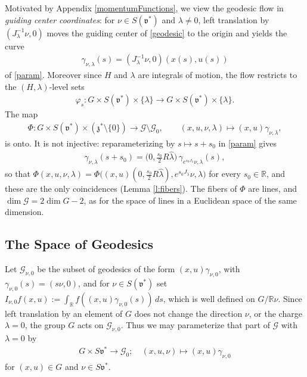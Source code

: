 \documentclass[11pt]{amsart}
\theoremstyle{plain}
\theoremstyle{definition}
\theoremstyle{remark}
\numberwithin{equation}{section}
\def\fz{\mathfrak{z}}
\def\fv{\mathfrak{v}}
\def\cG{\mathcal{G}}
\def\mz{\setminus\{0\}}
\def\R{{\mathbb R}}%
\numberwithin{equation}{section}
\begin{document}
Motivated by Appendix \ref{momentumFunctions}, we view the geodesic flow in \textit{guiding center coordinates}: for $\nu\in S(\fv^*)$ and $\lambda\neq0$, left translation by $(J_\lambda^{-1}\nu, 0)$ moves the guiding center of \eqref{geodesic} to the origin and yields the curve
\begin{align*}
	\gamma_{\nu, \lambda}(s)=\left(J_\lambda^{-1}\nu, 0\right)(x(s), u(s))
\end{align*}
of \eqref{param}.
Moreover since $H$ and $\lambda$ are integrals of motion, the flow restricts to the $(H, \lambda)$-level sets
\begin{align*}
	\varphi_{s}: G\times S(\fv^*)\times\{\lambda\}\to G\times S(\fv^*)\times\{\lambda\}.
\end{align*}
The map
\begin{align*}
	\Phi: G\times S(\fv^*)\times(\fz^*\mz)\to\cG\setminus\cG_0, \qquad (x, u, \nu, \lambda)\longmapsto(x, u)\gamma_{\nu, \lambda},
\end{align*}
is onto. It is not injective: reparameterizing by $s\mapsto s+s_0$ in \eqref{param} gives
\begin{align}\label{e:reparam}
	\gamma_{\nu, \lambda}(s+s_0)=\big(0, \tfrac{s_0}{2}R\hat\lambda\big)\,\gamma_{e^{s_0J_\lambda}\nu, \lambda}(s),
\end{align}
so that $\Phi(x, u, \nu, \lambda)=\Phi\big((x, u)(0, \tfrac{s_0}{2}R\hat\lambda), e^{s_0J_\lambda}\nu, \lambda\big)$ for every $s_0\in \R$, and these are the only coincidences (Lemma \ref{l:fibers}). The fibers of $\Phi$ are lines, and $\dim\cG=2\dim G-2$, as for the space of lines in a Euclidean space of the same dimension.
\subsection{The Space of Geodesics}\label{spaceGeodesics}
Let $\cG_{\nu, 0}$ be the subset of geodesics of the form $(x, u)\gamma_{\nu, 0}$, with $\gamma_{\nu, 0}(s)=(s\nu, 0)$, and for $\nu\in S(\fv^*)$ set $I_{\nu, 0}f(x, u):=\int_\R f((x, u)\gamma_{\nu, 0}(s))\,ds$, which is well defined on $G/\R\nu$. Since left translation by an element of $G$ does not change the direction $\nu$, or the charge $\lambda=0$, the group $G$ acts on $\cG_{\nu, 0}$. Thus we may  parameterize that part of $\cG$ with $\lambda=0$ by 
\begin{align*}
	G\times S\fv^*\to \cG_{0}; \quad (x, u, \nu)\mapsto (x, u)\gamma_{\nu, 0}
\end{align*}
for $(x, u)\in G$ and $\nu\in S\fv^*$.
\end{document}
